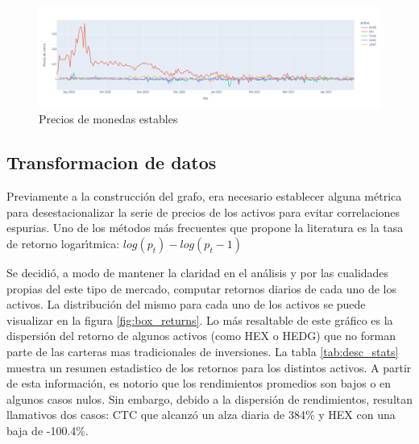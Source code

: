 \documentclass[runningheads,a4paper,10pt]{etc/llncs}
\begin{document}
\begin{figure}[htp]
    \centering
    \includegraphics[scale=0.3]{images/stablecoins_lineplot.png}
    \caption{Precios de monedas estables}
    \label{fig:stablecoins}
\end{figure}


\subsection{Transformacion de datos}
Previamente a la construcción del grafo, era necesario establecer alguna
métrica para desestacionalizar la serie de precios de los activos para evitar correlaciones espurias. Uno de los métodos más frecuentes que propone la literatura \cite{cryptonetwork} es la tasa de retorno logarı́tmica:
\begin{math} log(p_t) -log(p_t-1) \end{math}

Se decidió, a modo de mantener la claridad en el análisis y por las cualidades
propias del este tipo de mercado, computar retornos diarios de cada uno de los
activos. La distribución del mismo para cada uno de los activos se puede visualizar en la figura \ref{fig:box_returns}. Lo más resaltable de este gráfico es la dispersión del retorno de algunos activos (como HEX o HEDG) que no forman parte de las carteras mas tradicionales de inversiones.
La tabla \ref{tab:desc_stats} muestra un resumen estadistico de los retornos para los distintos activos. A partir de esta información, es notorio que los rendimientos promedios son bajos o en algunos casos nulos. Sin embargo, debido a la dispersión de rendimientos, resultan llamativos dos casos: CTC que alcanzó un alza diaria de 384\% y HEX con una baja de -100.4\%.
\end{document}
